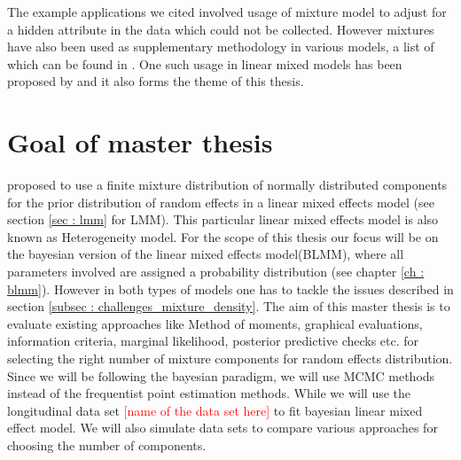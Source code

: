 
The example applications we cited involved usage of mixture model to adjust for a hidden attribute in the data which could not be collected. However mixtures have also been used as supplementary methodology in various models, a list of which can be found in \citet[pg. 238]{fruhwirth-schnatter_finite_2013}. One such usage in linear mixed models has been proposed by \citet{verbeke_linear_1996} and it also forms the theme of this thesis.\\

\section{Goal of master thesis}
\label{sec : goal}
\citet*{verbeke_linear_1996} proposed to use a finite mixture distribution of normally distributed components for the prior distribution of random effects in a linear mixed effects model (see section \ref{sec : lmm} for LMM). This particular linear mixed effects model is also known as Heterogeneity model. For the scope of this thesis our focus will be on the bayesian version of the linear mixed effects model(BLMM), where all parameters involved are assigned a probability distribution (see chapter \ref{ch : blmm}). However in both types of models one has to tackle the issues described in section \ref{subsec : challenges_mixture_density}. The aim of this master thesis is to evaluate existing approaches like Method of moments, graphical evaluations, information criteria, marginal likelihood, posterior predictive checks etc. for selecting the right number of mixture components for random effects distribution. Since we will be following the bayesian paradigm, we will use MCMC methods instead of the frequentist point estimation methods. While we will use the longitudinal data set \textcolor{red}{[name of the data set here]} to fit bayesian linear mixed effect model. We will also simulate data sets to compare various approaches for choosing the number of components.